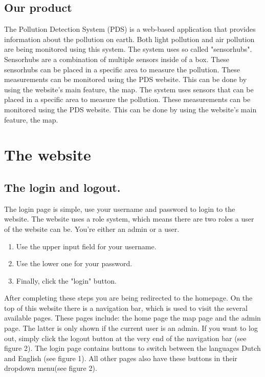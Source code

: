 \documentclass[a4paper]{article}
\begin{document}
\subsection{Our product}
The Pollution Detection System (PDS) is a web-based application that provides information about the pollution on earth. Both light pollution and air pollution are being monitored using this system.
\newline
\newline
The system uses so called "sensorhubs". Sensorhubs are a combination of multiple sensors inside of a box. These sensorhubs can be placed in a specific area to measure the pollution. These measurements can be monitored using the PDS website. This can be done by using the website's main feature, the map.
\newline
\newline
The system uses sensors that can be placed in a specific area to measure the pollution. These measurements can be monitored using the PDS website. This can be done by using the website's main feature, the map.

\newpage
\section{The website}
\subsection{The login and logout.}
The login page is simple, use your username and password to login to the website. The website uses a role system, which means there are two roles a user of the website can be. You're either an admin or a user. 

\begin{enumerate}[]
	\item Use the upper input field for your username.
	\item Use the lower one for your password.
	\item Finally, click the "login" button.
\end{enumerate}
\noindent
After completing these steps you are being redirected to the homepage.
\newline
\newline
On the top of this website there is a navigation bar, which is used to visit the several available pages. These pages include: the home page the map page and the admin page. The latter is only shown if the current user is an admin.
\newline
\newline
If you want to log out, simply click the logout button at the very end of the navigation bar (see figure 2).
\newline
\newline
The login page contains buttons to switch between the languages Dutch and English (see figure 1).
\newline
All other pages also have these buttons in their dropdown menu(see figure 2).
\newline
\end{document}
